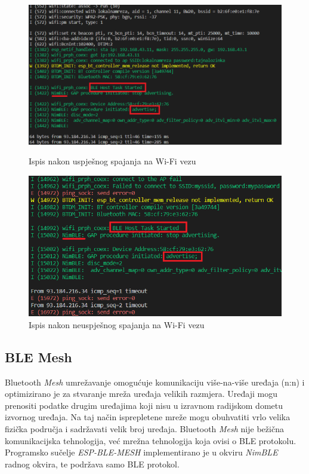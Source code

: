 \begin{figure}[ht]
	\begin{minipage}[t]{0.4\textwidth}
		\includegraphics[width=\linewidth]{imgs/spojen}
		\caption{Ispis nakon uspješnog spajanja na Wi-Fi vezu}
		\label{fig:spojen}
	\end{minipage}
	\hspace*{\fill}
	\begin{minipage}[t]{0.4\textwidth}
		\includegraphics[width=\linewidth]{imgs/nespojen}
		\caption{Ispis nakon neuspješnog spajanja na Wi-Fi vezu}
		\label{fig:nespojen}
	\end{minipage}
\end{figure}

\subsection{BLE Mesh}

Bluetooth \textit{Mesh} umrežavanje omogućuje komunikaciju više-na-više uređaja (n:n) i optimizirano je za stvaranje mreža uređaja velikih razmjera. Uređaji mogu prenositi podatke drugim uređajima koji nisu u izravnom radijskom dometu izvornog uređaja. Na taj način isprepletene mreže mogu obuhvatiti vrlo velika fizička područja i sadržavati velik broj uređaja. Bluetooth \textit{Mesh} nije bežična komunikacijska tehnologija, već mrežna tehnologija koja ovisi o BLE protokolu. Programsko sučelje \textit{ESP-BLE-MESH} implementirano je u okviru \textit{NimBLE} radnog okvira, te podržava samo BLE protokol. 

